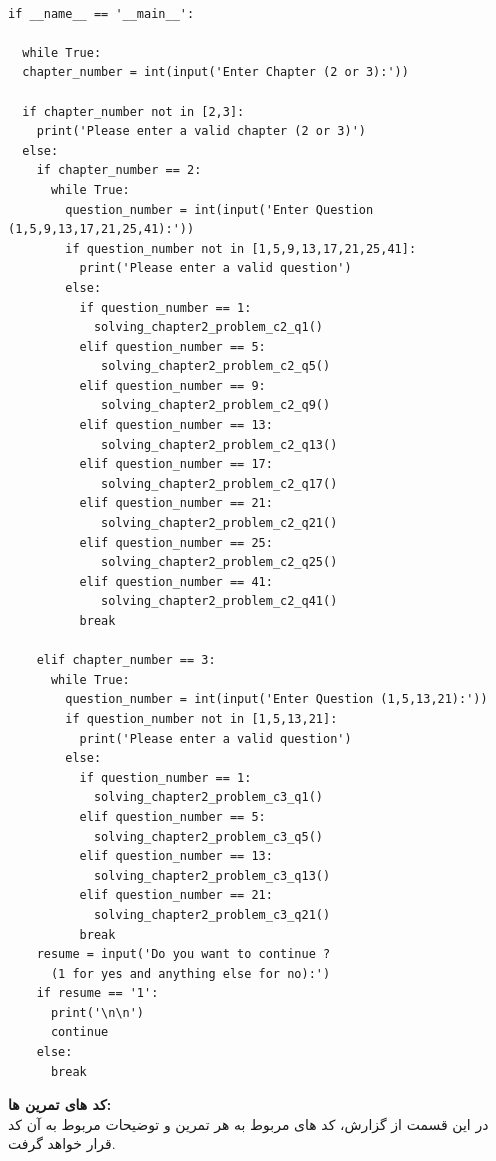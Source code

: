 \documentclass[a4paper,14pt]{article}
\begin{document}
\begin{latin}
	\begin{lstlisting}

if __name__ == '__main__':

  while True:
  chapter_number = int(input('Enter Chapter (2 or 3):'))

  if chapter_number not in [2,3]:
    print('Please enter a valid chapter (2 or 3)')
  else:
    if chapter_number == 2:
      while True:
        question_number = int(input('Enter Question (1,5,9,13,17,21,25,41):'))
        if question_number not in [1,5,9,13,17,21,25,41]:
          print('Please enter a valid question')
        else:
          if question_number == 1:
            solving_chapter2_problem_c2_q1()
          elif question_number == 5:
             solving_chapter2_problem_c2_q5()
          elif question_number == 9:
             solving_chapter2_problem_c2_q9()
          elif question_number == 13:
             solving_chapter2_problem_c2_q13()
          elif question_number == 17:
             solving_chapter2_problem_c2_q17()
          elif question_number == 21:
             solving_chapter2_problem_c2_q21()
          elif question_number == 25:
             solving_chapter2_problem_c2_q25()
          elif question_number == 41:
             solving_chapter2_problem_c2_q41()
          break

    elif chapter_number == 3:
      while True:
        question_number = int(input('Enter Question (1,5,13,21):'))
        if question_number not in [1,5,13,21]:
          print('Please enter a valid question')
        else:
          if question_number == 1:
            solving_chapter2_problem_c3_q1()
          elif question_number == 5:
            solving_chapter2_problem_c3_q5()
          elif question_number == 13:
            solving_chapter2_problem_c3_q13()
          elif question_number == 21:
            solving_chapter2_problem_c3_q21()
          break
    resume = input('Do you want to continue ? 
      (1 for yes and anything else for no):')
    if resume == '1':
      print('\n\n')
      continue
    else:
      break

	\end{lstlisting}
\end{latin}
	\fontsize{14}{14}\selectfont
	
	\textbf{کد های تمرین ها:}\\
	
	در این قسمت از گزارش، کد های مربوط به هر تمرین و توضیحات مربوط به آن کد قرار خواهد گرفت.\\
	
\end{document}
